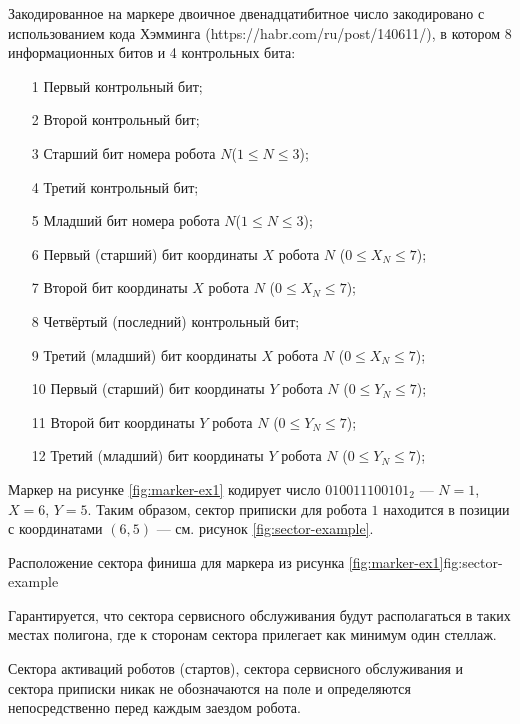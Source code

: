 Закодированное на маркере двоичное двенадцатибитное число закодировано с использованием кода Хэмминга (https://habr.com/ru/post/140611/), в котором 8 информационных битов
и 4 контрольных бита:
\begin{enumerate}
    \item[1] Первый контрольный бит;
    \item[2] Второй контрольный бит;
    \item[3] Старший бит номера робота $N$($1 \leq N \leq 3$);
    \item[4] Третий контрольный бит;
    \item[5] Младший бит номера робота $N$($1 \leq N \leq 3$);
    \item[6] Первый (старший) бит координаты $X$ робота $N$ ($0 \leq X_N \leq 7$);
    \item[7] Второй бит координаты $X$ робота $N$ ($0 \leq X_N \leq 7$);
    \item[8] Четвёртый (последний) контрольный бит;
    \item[9] Третий (младший) бит координаты $X$ робота $N$ ($0 \leq X_N \leq 7$);
    \item[10] Первый (старший) бит координаты $Y$ робота $N$ ($0 \leq Y_N \leq 7$);
    \item[11] Второй бит координаты $Y$ робота $N$ ($0 \leq Y_N \leq 7$);
    \item[12] Третий (младший) бит координаты $Y$ робота $N$ ($0 \leq Y_N \leq 7$);
\end{enumerate}


Маркер на рисунке \ref{fig:marker-ex1} кодирует число $010011100101_2$ --- $N = 1$, $X = 6$, $Y = 5$.
Таким образом, сектор приписки для робота $1$ находится в позиции с координатами $(6, 5)$ --- см. рисунок \ref{fig:sector-example}.


{Расположение сектора финиша для маркера из рисунка \ref{fig:marker-ex1}}{fig:sector-example}

Гарантируется, что сектора сервисного обслуживания будут располагаться в таких
местах полигона, где к сторонам сектора прилегает как минимум один стеллаж.

Сектора активаций роботов (стартов), сектора сервисного обслуживания и сектора приписки никак
не обозначаются на поле и определяются непосредственно перед каждым заездом робота.

